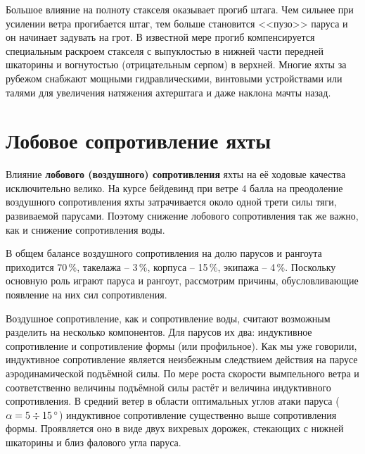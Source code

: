 Большое влияние на полноту стакселя оказывает прогиб штага. Чем
сильнее при усилении ветра прогибается штаг, тем больше становится
<<пузо>> паруса и он начинает задувать на грот. В известной мере
прогиб компенсируется специальным раскроем стакселя с выпуклостью в
нижней части передней шкаторины и вогнутостью (отрицательным серпом) в
верхней. Многие яхты за рубежом снабжают мощными гидравлическими,
винтовыми устройствами или талями для увеличения натяжения ахтерштага
и даже наклона мачты назад.

\section{Лобовое сопротивление яхты}

Влияние \textbf{лобового (воздушного) сопротивления}
  яхты на
её ходовые качества исключительно велико. На курсе бейдевинд при ветре
4 балла на преодоление воздушного сопротивления яхты затрачивается
около одной трети силы тяги, развиваемой парусами. Поэтому снижение
лобового сопротивления так же важно, как и снижение сопротивления
воды.

В общем балансе воздушного сопротивления на долю парусов и рангоута
приходится 70\,\%, такелажа \--- 3\,\%, корпуса \---
15\,\%, экипажа \--- 4\,\%. Поскольку основную роль
играют паруса и рангоут, рассмотрим причины, обусловливающие появление
на них сил сопротивления.

Воздушное сопротивление, как и сопротивление воды, считают возможным
разделить на несколько компонентов. Для парусов их два: индуктивное
сопротивление и сопротивление формы (или профильное). Как мы уже
говорили, индуктивное сопротивление является неизбежным следствием
действия на парусе аэродинамической подъёмной силы. По мере роста
скорости вымпельного ветра и соответственно величины подъёмной силы
растёт и величина индуктивного сопротивления. В средний ветер в
области оптимальных углов атаки паруса ($\alpha = 5\div 15\,^\circ$)
индуктивное сопротивление существенно выше сопротивления
формы. Проявляется оно в виде двух вихревых дорожек, стекающих с
нижней шкаторины и близ фалового угла паруса.
 
